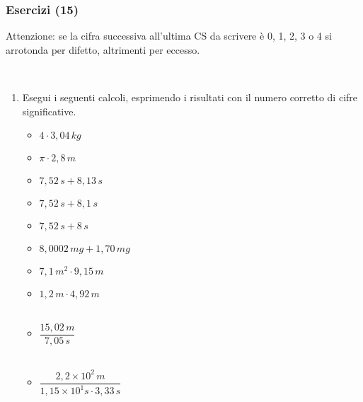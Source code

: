 \documentclass[]{beamer}
\begin{document}
\begin{frame}
\frametitle{Esercizi (15)}
\alert{Attenzione:} se la cifra successiva all'ultima CS da scrivere è 0, 1, 2, 3 o 4 si arrotonda per difetto, altrimenti per eccesso.

~

\begin{enumerate}
  \item Esegui i seguenti calcoli, esprimendo i risultati con il numero corretto di cifre significative.
  \begin{multicols}{2}
    \begin{itemize}
        \item $ 4 \cdot 3,04 \, kg $
        \item $ \pi \cdot 2,8 \, m $
        \item $ 7,52 \, s + 8,13 \, s $
        \item $ 7,52 \, s + 8,1 \, s $
        \item $ 7,52 \, s + 8 \, s $
        \item $ 8,0002 \, mg + 1,70 \, mg $
        \item $ 7,1 \, m^2 \cdot 9,15 \, m $
        \item $ 1,2 \, m \cdot 4,92 \, m $\\~
        \item $ \dfrac{15,02 \, m}{7,05 \, s} $\\~
        \item $ \dfrac{2,2 \times 10^2 \, m}{1,15 \times 10^1 s \cdot 3,33 \, s} $
    \end{itemize}
  \end{multicols}
\end{enumerate}
\end{frame}
\end{document}
